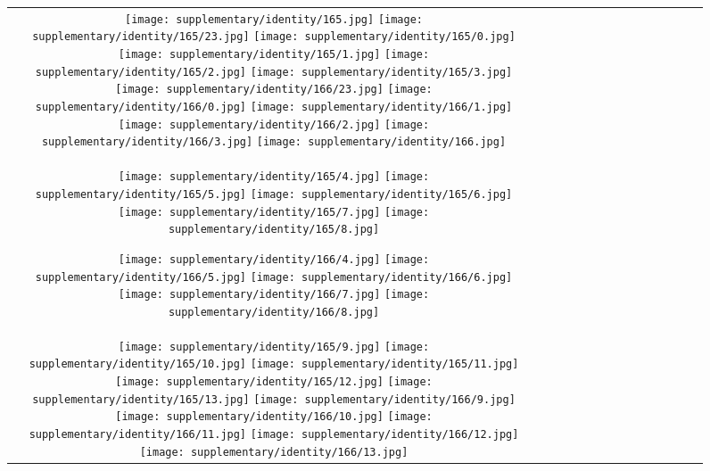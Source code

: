 \begin{figure*}[tb!]
    \centering
    \setlength{\tabcolsep}{0.5pt}
    {\small
    \renewcommand{\arraystretch}{0.5} 
    \begin{tabular}{c c c c c c c c c c c c c c }
    \captionsetup{type=figure, font=scriptsize}
  \texttt{[image: supplementary/identity/165.jpg]}
  \texttt{[image: supplementary/identity/165/23.jpg]}
  \texttt{[image: supplementary/identity/165/0.jpg]}
  \texttt{[image: supplementary/identity/165/1.jpg]}
  \texttt{[image: supplementary/identity/165/2.jpg]}
  \texttt{[image: supplementary/identity/165/3.jpg]}
    \hspace{5mm}
  \texttt{[image: supplementary/identity/166/23.jpg]}
  \texttt{[image: supplementary/identity/166/0.jpg]}
  \texttt{[image: supplementary/identity/166/1.jpg]}
  \texttt{[image: supplementary/identity/166/2.jpg]}
  \texttt{[image: supplementary/identity/166/3.jpg]}
  \texttt{[image: supplementary/identity/166.jpg]}

 \tabularnewline
  \texttt{[image: supplementary/identity/165/4.jpg]}
  \texttt{[image: supplementary/identity/165/5.jpg]}
  \texttt{[image: supplementary/identity/165/6.jpg]}
  \texttt{[image: supplementary/identity/165/7.jpg]}
  \texttt{[image: supplementary/identity/165/8.jpg]}
    \hspace{5mm}
    
  \texttt{[image: supplementary/identity/166/4.jpg]}
  \texttt{[image: supplementary/identity/166/5.jpg]}
  \texttt{[image: supplementary/identity/166/6.jpg]}
  \texttt{[image: supplementary/identity/166/7.jpg]}
  \texttt{[image: supplementary/identity/166/8.jpg]}
\tabularnewline
  \texttt{[image: supplementary/identity/165/9.jpg]}
  \texttt{[image: supplementary/identity/165/10.jpg]}
  \texttt{[image: supplementary/identity/165/11.jpg]}
  \texttt{[image: supplementary/identity/165/12.jpg]}
  \texttt{[image: supplementary/identity/165/13.jpg]}
    \hspace{5mm}
  \texttt{[image: supplementary/identity/166/9.jpg]}
  \texttt{[image: supplementary/identity/166/10.jpg]}
  \texttt{[image: supplementary/identity/166/11.jpg]}
  \texttt{[image: supplementary/identity/166/12.jpg]}
  \texttt{[image: supplementary/identity/166/13.jpg]}


\end{tabular}}
\end{figure*}
